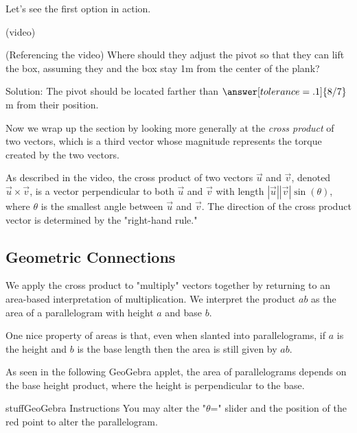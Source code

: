 \documentclass{ximera}
\begin{document}
Let's see the first option in action.

(video)

\begin{problem}
    (Referencing the video) Where should they adjust the pivot so that they can lift the box, assuming they and the box stay 1m from the center of the plank?

    Solution: The pivot should be located farther than $\answer[tolerance=.1]{8/7}$ m from their position.
\end{problem}

Now we wrap up the section by looking more generally at the \emph{cross product} of two vectors, which is a third vector whose magnitude represents the torque created by the two vectors.

\begin{center}
\end{center}

\begin{definition}
    As described in the video, the cross product of two vectors $\vec{u}$ and $\vec{v}$, denoted $\vec{u}\times \vec{v}$, is a vector perpendicular to both $\vec{u}$ and $\vec{v}$ with length $|\vec{u}||\vec{v}|\sin(\theta)$, where $\theta$ is the smallest angle between $\vec{u}$ and $\vec{v}$. The direction of the cross product vector is determined by the "right-hand rule."
\end{definition}

\subsection*{Geometric Connections}
We apply the cross product to "multiply" vectors together by returning to an area-based interpretation of multiplication. We interpret the product $ab$ as the area of a parallelogram with height $a$ and base $b$. 

One nice property of areas is that, even when slanted into parallelograms, if $a$ is the height and $b$ is the base length then the area is still given by $ab$.

As seen in the following GeoGebra applet, the area of parallelograms depends on the base height product, where the height is perpendicular to the base. 

\begin{expandable}{stuff}{GeoGebra Instructions}
    You may alter the "$\theta$=" slider and the position of the red point to alter the parallelogram.
\end{expandable}
\end{document}
